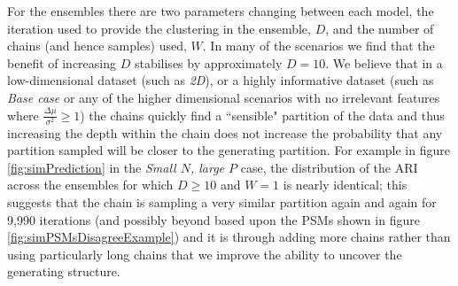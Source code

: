 \documentclass[]{article}
\begin{document}
For the ensembles there are two parameters changing between each model, the iteration used to provide the clustering in the ensemble, $D$, and the number of chains (and hence samples) used, $W$. In many of the scenarios we find that the benefit of increasing $D$ stabilises by approximately $D = 10$. We believe that in a low-dimensional dataset (such as \emph{2D}), or a highly informative dataset (such as \emph{Base case} or any of the higher dimensional scenarios with no irrelevant features where $\frac{\Delta \mu}{\sigma^2} \geq 1$) the chains quickly find a ``sensible" partition of the data and thus increasing the depth within the chain does not increase the probability that any partition sampled will be closer to the generating partition. For example in figure \ref{fig:simPrediction} in the \emph{Small $N$, large $P$} case, the distribution of the ARI across the ensembles for which $D\geq10$ and $W=1$ is nearly identical; this suggests that the chain is sampling a very similar partition again and again for 9,990 iterations (and possibly beyond based upon the PSMs shown in figure \ref{fig:simPSMsDisagreeExample}) and it is through adding more chains rather than using particularly long chains that we improve the ability to uncover the generating structure. 
\end{document}
